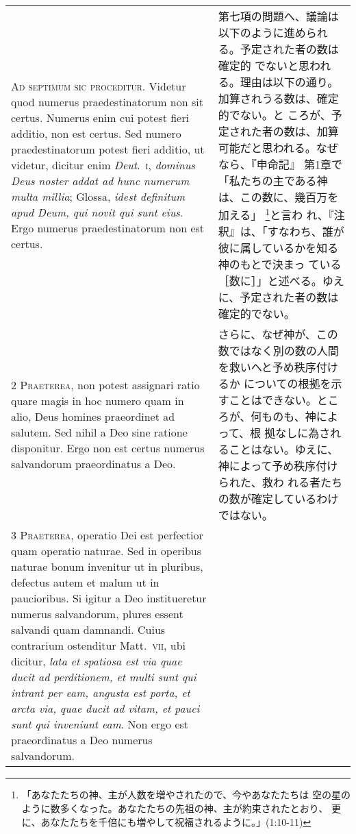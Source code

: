 \documentclass[10pt]{jsarticle} %
\begin{document}
\begin{longtable}{p{21em}p{21em}}


{\Huge A}{\scshape d septimum sic proceditur}. Videtur quod
numerus praedestinatorum non sit certus. Numerus enim cui potest fieri
additio, non est certus. Sed numero praedestinatorum potest fieri
additio, ut videtur, dicitur enim {\itshape Deut}.~{\scshape i}, {\itshape dominus Deus noster addat ad
hunc numerum multa millia}; Glossa, {\itshape idest definitum apud Deum, qui novit
qui sunt eius}. Ergo numerus praedestinatorum non est certus.


&

第七項の問題へ、議論は以下のように進められる。予定された者の数は確定的
でないと思われる。理由は以下の通り。加算されうる数は、確定的でない。と
ころが、予定された者の数は、加算可能だと思われる。なぜなら、『申命記』
第1章で「私たちの主である神は、この数に、幾百万を加える」
\footnote{「あなたたちの神、主が人数を増やされたので、今やあなたたちは
空の星のように数多くなった。あなたたちの先祖の神、主が約束されたとおり、
更に、あなたたちを千倍にも増やして祝福されるように。」(1:10-11)}と言わ
れ、『注釈』は、「すなわち、誰が彼に属しているかを知る神のもとで決まっ
ている［数に］」と述べる。ゆえに、予定された者の数は確定的でない。


\\


{\scshape 2 Praeterea}, non potest assignari ratio quare
magis in hoc numero quam in alio, Deus homines praeordinet ad
salutem. Sed nihil a Deo sine ratione disponitur. Ergo non est certus
numerus salvandorum praeordinatus a Deo.


&


さらに、なぜ神が、この数ではなく別の数の人間を救いへと予め秩序付けるか
についての根拠を示すことはできない。ところが、何ものも、神によって、根
拠なしに為されることはない。ゆえに、神によって予め秩序付けられた、救わ
れる者たちの数が確定しているわけではない。

\\


{\scshape 3 Praeterea}, operatio Dei est perfectior quam
operatio naturae. Sed in operibus naturae bonum invenitur ut in
pluribus, defectus autem et malum ut in paucioribus. Si igitur a Deo
institueretur numerus salvandorum, plures essent salvandi quam
damnandi. Cuius contrarium ostenditur Matt.~{\scshape vii}, ubi dicitur, {\itshape lata et
spatiosa est via quae ducit ad perditionem, et multi sunt qui intrant
per eam, angusta est porta, et arcta via, quae ducit ad vitam, et pauci
sunt qui inveniunt eam}. Non ergo est praeordinatus a Deo numerus
salvandorum.



\end{longtable}
\end{document}
